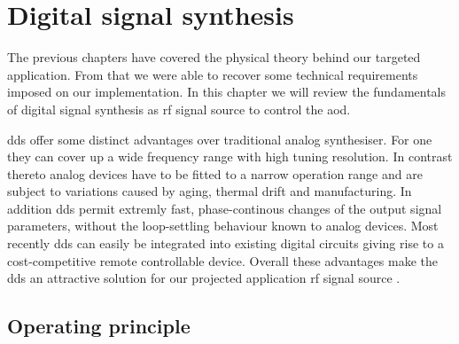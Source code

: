 \chapter{Digital signal synthesis}

The previous chapters have covered the physical theory behind our targeted
application. From that we were able to recover some technical requirements
imposed on our implementation. In this chapter we will review the fundamentals
of digital signal synthesis as \gls{rf} signal source to control the \gls{aod}.

\gls{dds} offer some distinct advantages over traditional analog synthesiser.
For one they can cover up a wide frequency range with high tuning resolution.
In contrast thereto analog devices have to be fitted to a narrow operation
range and are subject to variations caused by aging, thermal drift and
manufacturing. In addition \gls{dds} permit extremly fast, phase-continous
changes of the output signal parameters, without the loop-settling behaviour
known to analog devices. Most recently \gls{dds} can easily be integrated into
existing digital circuits giving rise to a cost-competitive remote
controllable device. Overall these advantages make the \gls{dds} an attractive
solution for our projected application \gls{rf} signal source \cite{ADTutDDS}.

\section{Operating principle}

